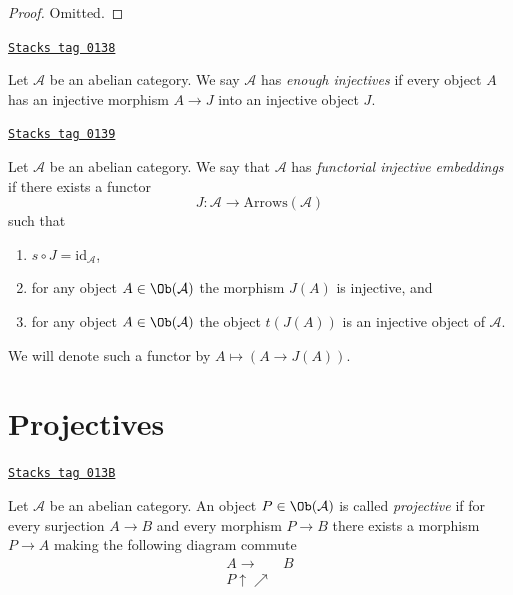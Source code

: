 \begin{proof}
Omitted.
\end{proof}

\begin{definition}
\label{homology-definition-enough-injectives}
\href{https://stacks.math.columbia.edu/tag/0138}{\texttt{Stacks tag 0138}}

Let $\mathcal{A}$ be an abelian category.
We say $\mathcal{A}$ has {\it enough injectives}
if every object $A$ has an injective morphism
$A \to J$ into an injective object $J$.
\end{definition}

\begin{definition}
\label{homology-definition-functorial-injective-embedding}
\href{https://stacks.math.columbia.edu/tag/0139}{\texttt{Stacks tag 0139}}

Let $\mathcal{A}$ be an abelian category.
We say that $\mathcal{A}$ has {\it functorial injective embeddings}
if there exists a functor
$$
J : \mathcal{A} \longrightarrow \text{Arrows}(\mathcal{A})
$$
such that
\begin{enumerate}
\item $s \circ J = \text{id}_\mathcal{A}$,
\item for any object $A \in \Ob(\mathcal{A})$
the morphism $J(A)$ is injective, and
\item for any object $A \in \Ob(\mathcal{A})$
the object $t(J(A))$ is an injective object of $\mathcal{A}$.
\end{enumerate}
We will denote such a functor by
$A \mapsto (A \to J(A))$.
\end{definition}

\section{Projectives}
\label{homology-section-projectives}
\begin{definition}[Projective]
\label{homology-definition-projective}
\href{https://stacks.math.columbia.edu/tag/013B}{\texttt{Stacks tag 013B}}

Let $\mathcal{A}$ be an abelian category.
An object $P \in \Ob(\mathcal{A})$ is
called {\it projective} if for every surjection
$A \rightarrow B$ and every morphism
$P \to B$ there exists a morphism $P \to A$ making
the following diagram commute
$$
\begin{array}{cc}A \longrightarrow & B \\ P \uparrow\nearrow & \end{array}
$$
\end{definition}

